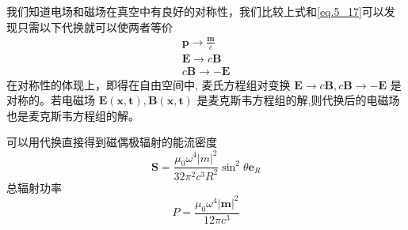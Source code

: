         我们知道电场和磁场在真空中有良好的对称性，我们比较上式和\ref{eq.5_17}可以发现只需以下代换就可以使两者等价
        \begin{equation}
            \begin{gathered}
                \boldsymbol{p} \to \frac{\boldsymbol{m}}{c} \\
                \boldsymbol{E} \to c \boldsymbol{B} \\
                c \boldsymbol{B} \to - \boldsymbol{E}
            \end{gathered}
        \end{equation}
        在对称性的体现上，即得在自由空间中, 麦氏方程组对变换 $\boldsymbol{E} \rightarrow c \boldsymbol{B}, c \boldsymbol{B} \rightarrow-\boldsymbol{E}$ 是对称的。若电磁场 $\boldsymbol{E}(\boldsymbol{x}, \boldsymbol{t}), \boldsymbol{B}(\boldsymbol{x}, \boldsymbol{t})$ 是麦克斯韦方程组的解,则代换后的电磁场也是麦克斯韦方程组的解。

        可以用代换直接得到磁偶极辐射的能流密度
        \begin{equation}
            \boldsymbol{S}=\frac{\mu_{0} \omega^{4}|m|^{2}}{32 \pi^{2} c^{3} R^{2}} \sin ^{2} \theta \boldsymbol{e}_{R}
        \end{equation}
        总辐射功率
        \begin{equation}
            P =\frac{\mu_0 \omega^4 |\boldsymbol{m}|^2}{12 \pi c^3}
        \end{equation}